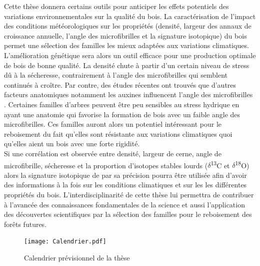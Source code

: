 \documentclass{report}
\newcommand{\Ctreize}{$\delta$\textsuperscript{13}C\xspace}
\newcommand{\Odixhuit}{$\delta$\textsuperscript{18}O\xspace}
\begin{document}
Cette thèse donnera certains outils pour anticiper les effets potentiels des variations environnementales sur la qualité du bois. La caractérisation de l'impact des conditions météorologiques sur les propriétés (densité, largeur des annaux de croissance annuelle, l'angle des microfibrilles et la signature isotopique) du bois permet une sélection des familles les mieux adaptées aux variations climatiques. L'amélioration génétique sera alors un outil efficace pour une production optimale de bois de bonne qualité. La densité chute à partir d'un certain niveau de stress dû à la sécheresse, contrairement à l'angle des microfibrilles qui semblent continués à croître. Par contre, des études récentes ont trouvés que d'autres facteurs anatomiques notamment les auxines influencent l'angle des microfibrilles \citep{Korbei2011,Chan2012}. Certaines familles d'arbres peuvent être peu sensibles au stress hydrique en ayant une anatomie qui favorise la formation de bois avec un faible angle des microfibrilles. Ces familles auront alors un potentiel intéressant pour le reboisement du fait qu'elles sont résistante aux variations climatiques quoi qu'elles aient un bois avec une forte rigidité. \\
Si une corrélation est observée entre densité, largeur de cerne, angle de microfibrille, sécheresse et la proportion d'isotopes stables lourds (\Ctreize et \Odixhuit) alors la signature isotopique de par sa précision pourra être utilisée afin d'avoir des informations à la fois sur les conditions climatiques et sur les les différentes propriétés du bois. L'interdisciplinarité de cette thèse lui permettra de contribuer à l'avancée des connaissances fondamentales de la science et aussi l'application des découvertes scientifiques par la sélection des familles pour le reboisement des forêts futures. 

\clearpage

\begin{landscape}
	
\begin{figure}
	\texttt{[image: Calendrier.pdf]}
	\caption{Calendrier prévisionnel de la thèse}
	\label{fig:calendrier}
	\end{figure}

\end{landscape}
 


\end{document}
